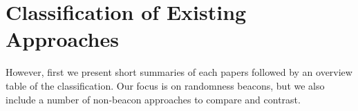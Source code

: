 \section{Classification of Existing Approaches}\label{sec:classification}
However, first we present short summaries of each papers followed by an overview table of the classification. Our focus is on randomness beacons, but we also include a number of non-beacon approaches to compare and contrast. 
